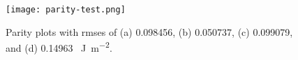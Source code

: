\begin{figure}[h]
	\centering
	\texttt{[image: parity-test.png]}
	\label{fig:parity-test}
	\caption{Parity plots with \glspl{rmse} of (a) 0.098456, (b) 0.050737, (c) 0.099079,  and (d) 0.14963 \SI{}{\J\per\square\m}.}
\end{figure}